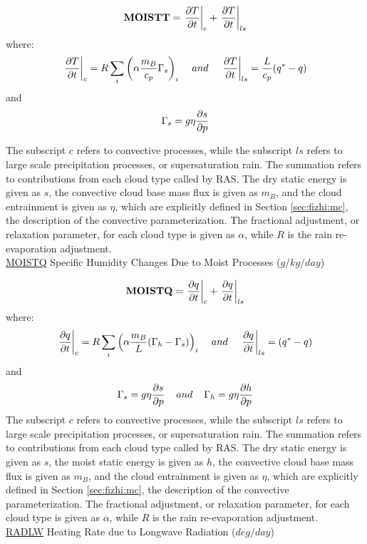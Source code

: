 \noindent
\[
{\bf MOISTT} = \left. {\frac{\partial T}{\partial t}}\right|_{c} + \left. {\frac{\partial T}{\partial t}} \right|_{ls}
\]
where:
\[
\left.{\frac{\partial T}{\partial t}}\right|_{c} = R \sum_i \left( \alpha \frac{m_B}{c_p} \Gamma_s \right)_i 
\hspace{.4cm} and 
\hspace{.4cm} \left.{\frac{\partial T}{\partial t}}\right|_{ls} = \frac{L}{c_p} (q^*-q)
\]
and
\[
\Gamma_s = g \eta \frac{\partial s}{\partial p}
\]

\noindent
The subscript $c$ refers to convective processes, while the subscript $ls$ refers to large scale
precipitation processes, or supersaturation rain. 
The summation refers to contributions from each cloud type called by RAS.  
The dry static energy is given 
as $s$, the convective cloud base mass flux is given as $m_B$, and the cloud entrainment is
given as $\eta$, which are explicitly defined in Section \ref{sec:fizhi:mc}, 
the description of the convective parameterization.  The fractional adjustment, or relaxation
parameter, for each cloud type is given as $\alpha$, while
$R$ is the rain re-evaporation adjustment.
\\

\noindent
{ \underline {MOISTQ} Specific Humidity Changes Due to Moist Processes ($g/kg/day$) } 

\noindent
\[
{\bf MOISTQ} = \left. {\frac{\partial q}{\partial t}}\right|_{c} + \left. {\frac{\partial q}{\partial t}} \right|_{ls}
\]
where:
\[
\left.{\frac{\partial q}{\partial t}}\right|_{c} = R \sum_i \left( \alpha \frac{m_B}{L}(\Gamma_h-\Gamma_s) \right)_i 
\hspace{.4cm} and 
\hspace{.4cm} \left.{\frac{\partial q}{\partial t}}\right|_{ls} = (q^*-q)
\]
and
\[
\Gamma_s = g \eta \frac{\partial s}{\partial p}\hspace{.4cm} and \hspace{.4cm}\Gamma_h = g \eta \frac{\partial h}{\partial p}
\]
\noindent
The subscript $c$ refers to convective processes, while the subscript $ls$ refers to large scale
precipitation processes, or supersaturation rain. 
The summation refers to contributions from each cloud type called by RAS.  
The dry static energy is given as $s$, 
the moist static energy is given as $h$, 
the convective cloud base mass flux is given as $m_B$, and the cloud entrainment is
given as $\eta$, which are explicitly defined in Section \ref{sec:fizhi:mc}, 
the description of the convective parameterization.  The fractional adjustment, or relaxation
parameter, for each cloud type is given as $\alpha$, while
$R$ is the rain re-evaporation adjustment.
\\

\noindent
{ \underline {RADLW} Heating Rate due to Longwave Radiation ($deg/day$) }

